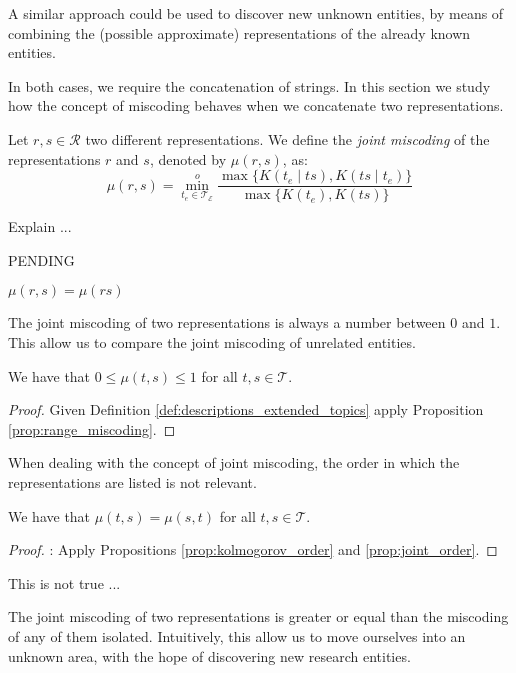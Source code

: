 A similar approach could be used to discover new unknown entities, by means of combining the (possible approximate) representations of the already known entities.

In both cases, we require the concatenation of strings. In this section we study how the concept of miscoding behaves when we concatenate two representations.

\begin{definition}
Let $r, s \in \mathcal{R}$ two different representations. We define the \emph{joint miscoding} of the representations $r$ and $s$, denoted by $\mu(r, s)$, as:
\[
\mu(r, s) =  \overset{o}{ \underset{t_e \in \mathcal{T}_\mathcal{E}} \min} \frac{ \max\{ K(t_e \mid ts), K(ts \mid t_e) \} } { \max\{ K(t_e), K(ts) \} }
\]
\end{definition}

Explain ...

\begin{example}
{\color{red} PENDING}
\end{example}

$\mu(r, s) = \mu(rs)$

The joint miscoding of two representations is always a number between $0$ and $1$. This allow us to compare the joint miscoding of unrelated entities.

\begin{proposition}
We have that $0 \leq \mu(t,s) \leq 1$ for all $t, s \in \mathcal{T}$.
\end{proposition}
\begin{proof}
Given Definition \ref{def:descriptions_extended_topics} apply Proposition \ref{prop:range_miscoding}.
\end{proof}

When dealing with the concept of joint miscoding, the order in which the representations are listed is not relevant.

\begin{proposition}
We have that $\mu(t,s) = \mu(s,t)$ for all $t,s \in \mathcal{T}$.
\end{proposition}
\begin{proof}
{\color{red}: Apply Propositions \ref{prop:kolmogorov_order} and \ref{prop:joint_order}.}
\end{proof}

This is not true ...

The joint miscoding of two representations is greater or equal than the miscoding of any of them isolated. Intuitively, this allow us to move ourselves into an unknown area, with the hope of discovering new research entities.

